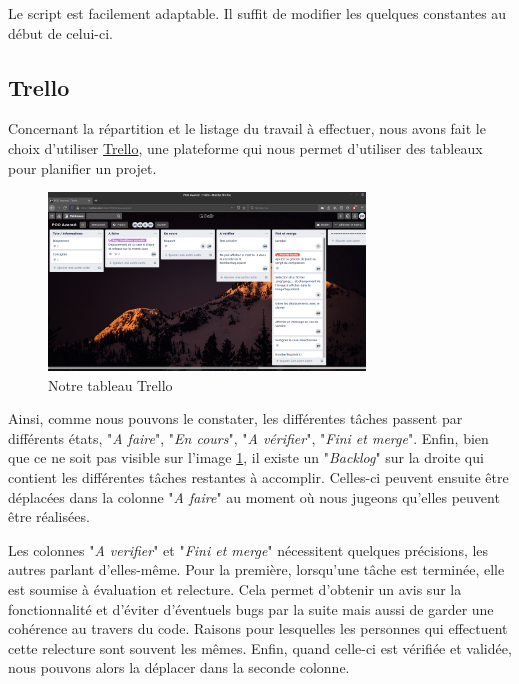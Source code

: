			Le script est facilement adaptable. Il suffit de modifier les quelques constantes au début de celui-ci.

		\subsection{Trello}

			Concernant la répartition et le listage du travail à effectuer, nous avons fait le choix d'utiliser \href{https://trello.com}{Trello}, une plateforme qui nous permet d'utiliser des tableaux pour planifier un projet.

			\begin{figure}[H]
				\centering\includegraphics[width=0.75\textwidth, keepaspectratio]{img/trello.png}
				\caption{Notre tableau Trello}
				\label{fig:trello}
			\end{figure}

			Ainsi, comme nous pouvons le constater, les différentes tâches passent par différents états, "\textit{A faire}", "\textit{En cours}", "\textit{A vérifier}", "\textit{Fini et merge}". Enfin, bien que ce ne soit pas visible sur l'image \ref{fig:trello}, il existe un "\textit{Backlog}" sur la droite qui contient les différentes tâches restantes à accomplir. Celles-ci peuvent ensuite être déplacées dans la colonne "\textit{A faire}" au moment où nous jugeons qu'elles peuvent être réalisées.

			Les colonnes "\textit{A verifier}" et "\textit{Fini et merge}" nécessitent quelques précisions, les autres parlant d'elles-même. Pour la première, lorsqu'une tâche est terminée, elle est soumise à évaluation et relecture. Cela permet d'obtenir un avis sur la fonctionnalité et d'éviter d'éventuels bugs par la suite mais aussi de garder une cohérence au travers du code. Raisons pour lesquelles les personnes qui effectuent cette relecture sont souvent les mêmes. Enfin, quand celle-ci est vérifiée et validée, nous pouvons alors la déplacer dans la seconde colonne.

